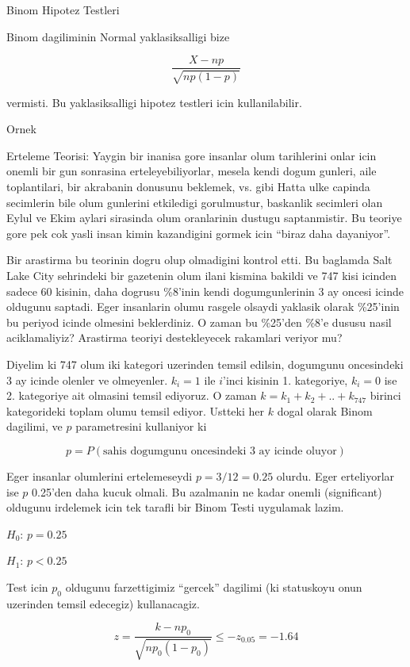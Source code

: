 \documentclass[12pt,fleqn]{article}\usepackage{../common}
\begin{document}
Binom Hipotez Testleri

Binom dagiliminin Normal yaklasiksalligi bize

$$ \frac{X-np}{\sqrt{np(1-p)}} $$

vermisti. Bu yaklasiksalligi hipotez testleri icin kullanilabilir.

Ornek

Erteleme Teorisi: Yaygin bir inanisa gore insanlar olum tarihlerini onlar
icin onemli bir gun sonrasina erteleyebiliyorlar, mesela kendi dogum
gunleri, aile toplantilari, bir akrabanin donusunu beklemek, vs. gibi Hatta
ulke capinda secimlerin bile olum gunlerini etkiledigi gorulmustur,
baskanlik secimleri olan Eylul ve Ekim aylari sirasinda olum oranlarinin
dustugu saptanmistir. Bu teoriye gore pek cok yasli insan kimin kazandigini
gormek icin ``biraz daha dayaniyor''.

Bir arastirma bu teorinin dogru olup olmadigini kontrol etti. Bu baglamda
Salt Lake City sehrindeki bir gazetenin olum ilani kismina bakildi ve 747
kisi icinden sadece 60 kisinin, daha dogrusu \%8'inin kendi dogumgunlerinin
3 ay oncesi icinde oldugunu saptadi. Eger insanlarin olumu rasgele olsaydi
yaklasik olarak \%25'inin bu periyod icinde olmesini beklerdiniz. O zaman
bu \%25'den \%8'e dususu nasil aciklamaliyiz?  Arastirma teoriyi
destekleyecek rakamlari veriyor mu?

Diyelim ki 747 olum iki kategori uzerinden temsil edilsin, dogumgunu
oncesindeki 3 ay icinde olenler ve olmeyenler. $k_i=1$ ile $i$'inci kisinin
1. kategoriye, $k_i=0$ ise 2. kategoriye ait olmasini temsil ediyoruz. O
zaman $k = k_1 + k_2 + .. + k_{747}$ birinci kategorideki toplam olumu
temsil ediyor. Ustteki her $k$ dogal olarak Binom dagilimi, ve $p$
parametresini kullaniyor ki 

$$ p = P(\textrm{sahis dogumgunu oncesindeki 3 ay icinde oluyor}) $$

Eger insanlar olumlerini ertelemeseydi $p = 3/12 = 0.25$ olurdu. Eger
erteliyorlar ise $p$ 0.25'den daha kucuk olmali. Bu azalmanin ne kadar
onemli (significant) oldugunu irdelemek icin tek tarafli bir Binom Testi
uygulamak lazim. 

$H_0$: $p = 0.25$

$H_1$: $p < 0.25$

Test icin $p_0$ oldugunu farzettigimiz ``gercek'' dagilimi (ki statuskoyu
onun uzerinden temsil edecegiz) kullanacagiz. 

$$ z = \frac{k-np_0}{\sqrt{np_0(1-p_0)}} \le -z_{0.05} = -1.64 $$
\end{document}
